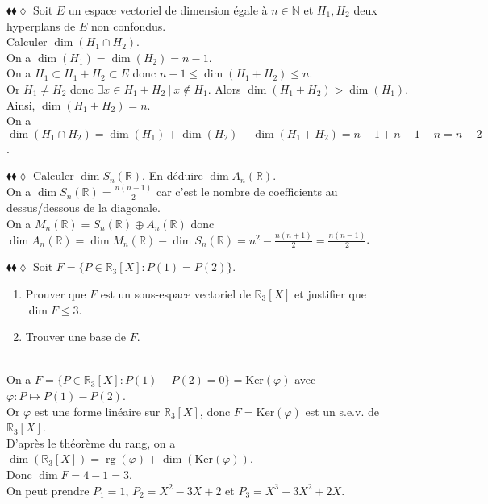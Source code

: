 \documentclass[11pt]{article}
\newcommand*{\R}{\mathbb{R}}
\newcommand*{\N}{\mathbb{N}}
\renewcommand*{\phi}{\varphi}
\renewcommand*{\ker}{\textrm{Ker}}
\DeclareMathOperator*{\rg}{rg}
\begin{document}
\begin{exercise}{$\blacklozenge\blacklozenge\lozenge$}{}
    Soit $E$ un espace vectoriel de dimension égale à $n\in\N$ et $H_1,H_2$ deux hyperplans de $E$ non confondus.\\
    Calculer $\dim(H_1 \cap H_2)$.
    \tcblower\\[0.2cm]
    On a $\dim(H_1) = \dim(H_2) = n-1$.\\
    On a $H_1 \subset H_1 + H_2 \subset E$ donc $n-1 \leq \dim(H_1 + H_2) \leq n$.\\
    Or $H_1 \neq H_2$ donc $\exists x \in H_1 + H_2 ~ | ~ x \notin H_1$. Alors $\dim(H_1 + H_2) > \dim(H_1)$.\\
    Ainsi, $\dim(H_1 + H_2) = n$.\\
    On a $\dim(H_1 \cap H_2) = \dim(H_1) + \dim(H_2) - \dim(H_1 + H_2) = n - 1 + n - 1 - n = n - 2$.
\end{exercise}

\begin{exercise}{$\blacklozenge\blacklozenge\lozenge$}{}
    Calculer $\dim S_n(\R)$. En déduire $\dim A_n(\R)$.
    \tcblower\\[0.2cm]
    On a $\dim S_n(\R) = \frac{n(n+1)}{2}$ car c'est le nombre de coefficients au dessus/dessous de la diagonale.\\
    On a $M_n(\R) = S_n(\R) \oplus A_n(\R)$ donc $\dim A_n(\R) = \dim M_n(\R) - \dim S_n(\R) = n^2 - \frac{n(n+1)}{2} = \frac{n(n-1)}{2}$.
\end{exercise}

\begin{exercise}{$\blacklozenge\blacklozenge\lozenge$}{}
    Soit $F = \{P \in \R_3[X] : P(1) = P(2)\}$.
    \begin{enumerate}[topsep=0pt,itemsep=-0.9 ex]
        \item Prouver que $F$ est un sous-espace vectoriel de $\R_3[X]$ et justifier que $\dim F \leq 3$.
        \item Trouver une base de $F$.
    \end{enumerate}
    \tcblower\\[0.2cm]
     On a $F = \{P \in \R_3[X] : P(1) - P(2) = 0\} = \ker(\phi)$ avec $\phi : P \mapsto P(1) - P(2)$.\\
    Or $\phi$ est une forme linéaire sur $\R_3[X]$, donc $F = \ker(\phi)$ est un s.e.v. de $\R_3[X]$.\\
    D'après le théorème du rang, on a $\dim(\R_3[X]) = \rg(\phi) + \dim(\ker(\phi))$.\\
    Donc $\dim F = 4 - 1 = 3$.\\[0.2cm]
     On peut prendre $P_1 = 1$, $P_2 = X^2 - 3X + 2$ et $P_3 = X^3 - 3X^2 + 2X$.
\end{exercise}
\end{document}
